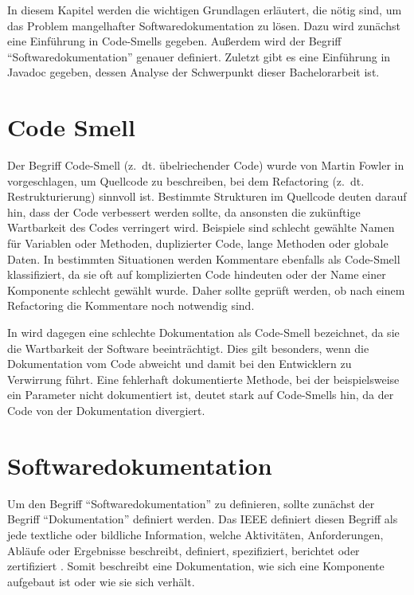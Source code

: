 \label{sec:background}
In diesem Kapitel werden die wichtigen Grundlagen erläutert, die nötig sind, um das Problem mangelhafter Softwaredokumentation zu lösen.  Dazu wird zunächst eine Einführung in Code-Smells gegeben. Außerdem wird der Begriff \enquote{Softwaredokumentation} genauer definiert. Zuletzt gibt es eine Einführung in Javadoc gegeben, dessen Analyse der Schwerpunkt dieser Bachelorarbeit ist.
\section{Code Smell}
Der Begriff Code-Smell (z.~dt. übelriechender Code)  wurde von Martin Fowler in \cite[S. 71 ff.]{fowler2019refactoring}  vorgeschlagen, um Quellcode zu beschreiben, bei dem Refactoring (z.~dt. Restrukturierung) sinnvoll ist. Bestimmte Strukturen im Quellcode deuten darauf hin, dass der Code verbessert werden sollte, da ansonsten die zukünftige Wartbarkeit des Codes verringert wird. Beispiele sind schlecht gewählte Namen für Variablen oder Methoden, duplizierter Code, lange Methoden oder globale Daten. In bestimmten Situationen werden Kommentare ebenfalls als Code-Smell klassifiziert, da sie oft auf komplizierten  Code hindeuten oder der Name einer Komponente schlecht gewählt wurde. Daher sollte geprüft werden, ob nach einem Refactoring die Kommentare noch notwendig sind.

In \cite[S. 249-250]{JavadocViolationsandTheirEvolutioninOpen-SourceSoftware} wird dagegen eine schlechte Dokumentation als Code-Smell bezeichnet, da sie die Wartbarkeit der Software beeinträchtigt. Dies gilt besonders, wenn die Dokumentation vom Code abweicht und damit bei den Entwicklern zu Verwirrung führt. Eine fehlerhaft dokumentierte Methode, bei der beispielsweise ein Parameter nicht dokumentiert ist, deutet stark auf Code-Smells hin, da der Code von der Dokumentation divergiert.  

\section{Softwaredokumentation}
Um den Begriff \enquote{Softwaredokumentation} zu definieren, sollte zunächst der Begriff \enquote{Dokumentation} definiert werden. Das IEEE  definiert diesen Begriff als jede textliche oder bildliche Information, welche Aktivitäten, Anforderungen, Abläufe oder Ergebnisse beschreibt, definiert, spezifiziert, berichtet oder zertifiziert \cite[S. 28]{IEEEStandardGlossaryofSoftwareEngineeringTerminology}. Somit beschreibt eine Dokumentation, wie sich eine Komponente aufgebaut ist oder wie sie sich verhält.

